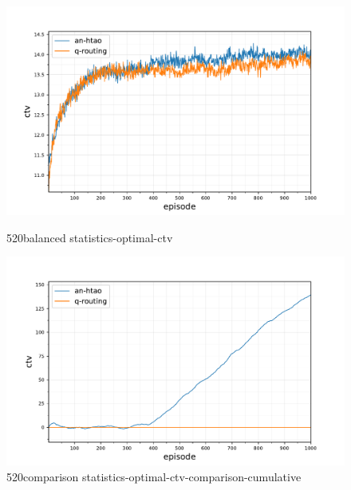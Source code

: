 \begin{figure}[ht]
	\begin{minipage}{.49\textwidth}
		\centering
		\includegraphics[width=1.0\linewidth,trim={25pt 0pt 50pt 0pt},clip]{520balanced_statistics-optimal-ctv}
		\captionsetup{labelfont=bf,singlelinecheck=on}
		\caption{520balanced statistics-optimal-ctv}
		\label{fig:520balanced_statistics-optimal-ctv}
	\end{minipage}
	\begin{minipage}{.49\textwidth}
		\centering
		\includegraphics[width=1.0\linewidth,trim={25pt 0pt 50pt 0pt},clip]{520comparison_statistics-optimal-ctv-comparison-cumulative}
		\captionsetup{labelfont=bf,singlelinecheck=on}
		\caption{520comparison statistics-optimal-ctv-comparison-cumulative}
		\label{fig:520comparisonstatistics-optimal-ctv-comparison-cumulative}
	\end{minipage}\hfill%
\end{figure}

